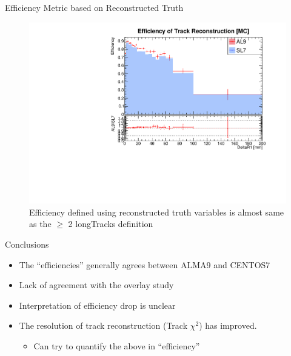 \begin{frame}{Efficiency Metric based on Reconstructed Truth}
    \begin{figure}
        \includegraphics[width=0.9\linewidth]{output/Effi_MC_pass_DeltaR1_unzoom.pdf}
        \caption{Efficiency defined using reconstructed truth variables is almost same as the $\geq$ 2 longTracks definition}
    \end{figure}
    
\end{frame}

\begin{frame}{Conclusions}
    \begin{itemize}
        \small
        \item The ``efficiencies'' generally agrees between ALMA9 and CENTOS7
        \item Lack of agreement with the overlay study
        \item Interpretation of efficiency drop is unclear
        \item The resolution of track reconstruction (Track $\chi^2$) has improved.
        \begin{itemize}
            \item Can try to quantify the above in ``efficiency''
        \end{itemize}
    \end{itemize}
\end{frame}

    
